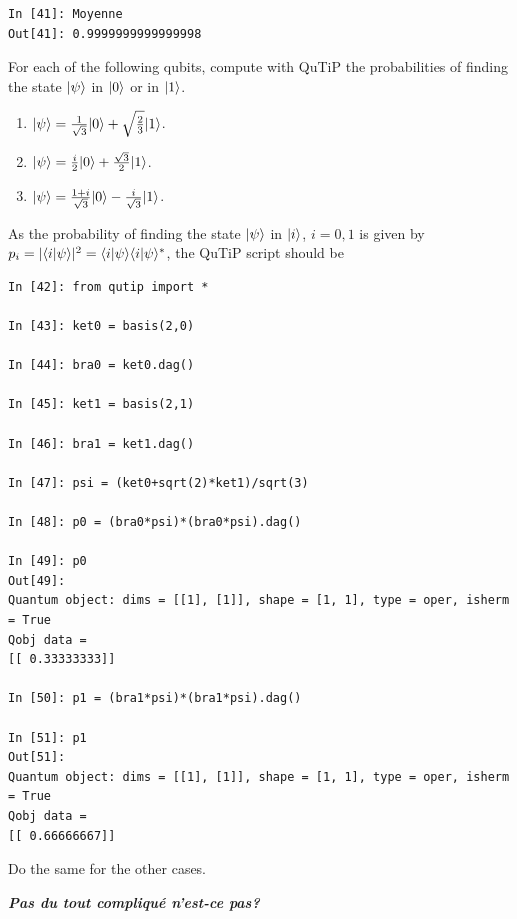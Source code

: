\begin{itemize}
\begin{example}
\begin{lstlisting}
In [41]: Moyenne
Out[41]: 0.9999999999999998
\end{lstlisting}
\end{example}


\begin{exercise}
For each of the following qubits, compute with QuTiP the probabilities of 
finding the state $\vert\psi\rangle$ in $\vert0\rangle$ or in $\vert1\rangle$.
\begin{enumerate}
 \item $\vert\psi\rangle=\frac{1}{\sqrt{3}}\vert0\rangle+\sqrt{\frac{2}{3}}\vert1\rangle$.
 \item $\vert\psi\rangle=\frac{i}{2}\vert0\rangle+\frac{\sqrt{3}}{2}\vert1\rangle$.
 \item $\vert\psi\rangle=\frac{1+i}{\sqrt{3}}\vert0\rangle-\frac{i}{\sqrt{3}}\vert1\rangle$.
\end{enumerate}
\end{exercise}

\begin{footnotesize}
\begin{solution}
 As the probability of finding the state $\vert\psi\rangle$ in $\vert i\rangle$, $i=0,1$ is 
given by $p_i=|\langle i\vert\psi\rangle|^2=\langle i\vert\psi\rangle\langle i\vert\psi\rangle^*$, 
the QuTiP script should be \\
\begin{lstlisting}
In [42]: from qutip import *

In [43]: ket0 = basis(2,0)

In [44]: bra0 = ket0.dag()

In [45]: ket1 = basis(2,1)

In [46]: bra1 = ket1.dag()

In [47]: psi = (ket0+sqrt(2)*ket1)/sqrt(3) 

In [48]: p0 = (bra0*psi)*(bra0*psi).dag()

In [49]: p0
Out[49]: 
Quantum object: dims = [[1], [1]], shape = [1, 1], type = oper, isherm = True
Qobj data =
[[ 0.33333333]]

In [50]: p1 = (bra1*psi)*(bra1*psi).dag()

In [51]: p1
Out[51]: 
Quantum object: dims = [[1], [1]], shape = [1, 1], type = oper, isherm = True
Qobj data =
[[ 0.66666667]]
\end{lstlisting}
Do the same for the other cases.

\textbf{\emph{Pas du tout compliqué n'est-ce pas?}}
\end{solution}
\end{footnotesize}
\newpage



\end{itemize}

